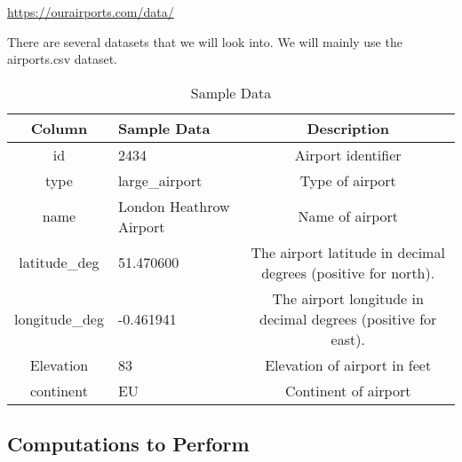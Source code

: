 \documentclass[fontsize=11pt]{article}
\begin{document}
        \url{https://ourairports.com/data/}

        \noindent There are several datasets that we will look into. We will mainly use the airports.csv dataset.

        
        \begin{table}[H]
            \centering
            \begin{tabular}{|c|l|c|} \hline 
                  Column&Sample Data& Description\\ \hline 
                  id&2434& Airport identifier\\ \hline 
                  type&large\_airport& Type of airport\\ \hline 
                  name&London Heathrow Airport& Name of airport\\ \hline 
                  latitude\_deg&51.470600& The airport latitude in decimal degrees (positive for north).\\ \hline 
                  longitude\_deg&-0.461941& The airport longitude in decimal degrees (positive for east).\\ \hline 
                Elevation& 83&Elevation of airport in feet\\\hline \hline 
                  continent&EU& Continent of airport\\\hline
            \end{tabular}
        \caption{Sample Data}
        \label{tab:my_table}
            
            
        \end{table}
        
        
\subsection{Computations to Perform}
\end{document}
